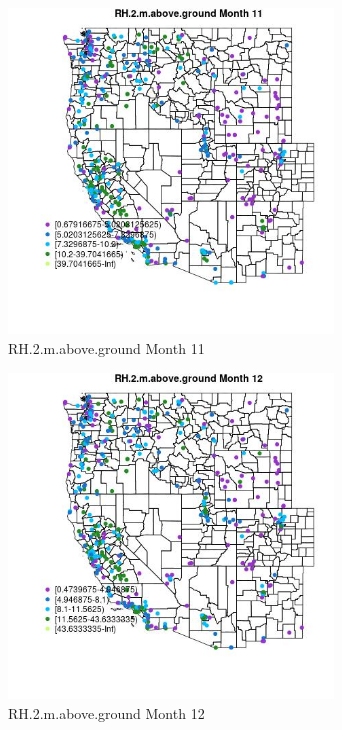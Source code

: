 \begin{figure} 
\centering  
\includegraphics[width=0.77\textwidth]{Code_Outputs/ML_input_report_ML_input_PM25_Step5_part_d_de_duplicated_aves_ML_input_MapObsMo11RH2maboveground.jpg} 
\caption{\label{fig:ML_input_report_ML_input_PM25_Step5_part_d_de_duplicated_aves_ML_inputMapObsMo11RH2maboveground}RH.2.m.above.ground Month 11} 
\end{figure} 
 

\begin{figure} 
\centering  
\includegraphics[width=0.77\textwidth]{Code_Outputs/ML_input_report_ML_input_PM25_Step5_part_d_de_duplicated_aves_ML_input_MapObsMo12RH2maboveground.jpg} 
\caption{\label{fig:ML_input_report_ML_input_PM25_Step5_part_d_de_duplicated_aves_ML_inputMapObsMo12RH2maboveground}RH.2.m.above.ground Month 12} 
\end{figure} 
 

